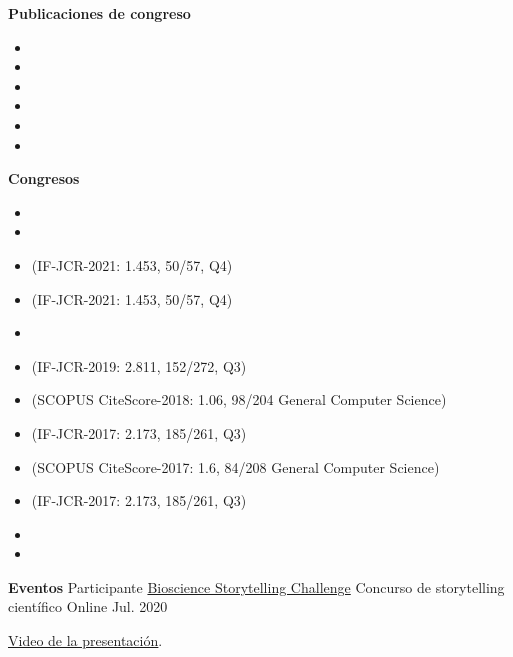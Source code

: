 
\textbf{Publicaciones de congreso}
\begin{itemize}
 \item {} 
 \item {} 
 \item {}
 \item {}
 \item {}
 \item {}
\end{itemize}


\textbf{Congresos}
\begin{itemize}
 \item {} 
 \item {}
 \item {} (IF-JCR-2021: 1.453, 50/57, Q4)
 \item {} (IF-JCR-2021: 1.453, 50/57, Q4)
 \item {} 
 \item {} (IF-JCR-2019: 2.811, 152/272, Q3)
 \item {} (SCOPUS CiteScore-2018: 1.06, 98/204 General Computer Science)
 \item {} (IF-JCR-2017: 2.173, 185/261, Q3)
 \item {} (SCOPUS CiteScore-2017: 1.6, 84/208 General Computer Science)
 \item {} (IF-JCR-2017: 2.173, 185/261, Q3)
 \item {}
 \item {}
\end{itemize}

\textbf{Eventos}
  \cventry
    {Participante \href{https://microbiosdigital.com/20/08/03/bioscience-storytelling-challenge/}{Bioscience Storytelling Challenge}} %
    {Concurso de storytelling científico} %
    {Online} %
    {Jul. 2020} %
    {
    \begin{cvitems} %
        \item {\underline{\href{https://m.youtube.com/watch?v=rB3-6bywW_Q}{Video de la presentación}}.}        	\end{cvitems}
    }
    
